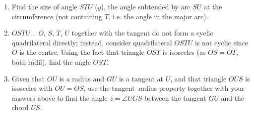 \begin{question}
\begin{enumerate}
    \item[(a)] Find the size of angle $STU$ ($y$), the angle subtended by arc $SU$ at the circumference (not containing $T$, i.e. the angle in the major arc).

    \vspace{3.5cm}

    \item[(b)] $OSTU$... $O$, $S$, $T$, $U$ together with the tangent do not form a cyclic quadrilateral directly; instead, consider quadrilateral $OSTU$ is not cyclic since $O$ is the centre. Using the fact that triangle $OST$ is isosceles (as $OS = OT$, both radii), find the angle $OST$.

    \vspace{3.5cm}

    \item[(c)] Given that $OU$ is a radius and $GU$ is a tangent at $U$, and that triangle $OUS$ is isosceles with $OU = OS$, use the tangent--radius property together with your answers above to find the angle $z = \angle UGS$ between the tangent $GU$ and the chord $US$.

    \vspace{4cm}
\end{enumerate}
\end{question}
